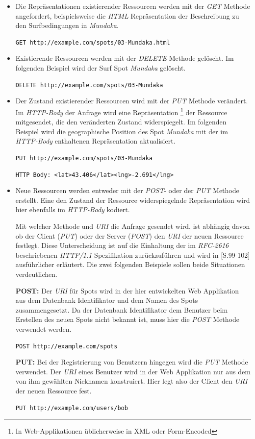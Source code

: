 \begin{itemize}
\item Die Repräsentationen existierender Ressourcen werden mit der
  \textit{GET} Methode angefordert, beispielsweise die \textit{HTML}
  Repräsentation der Beschreibung zu den Surfbedingungen in
  \textit{Mundaka}.

  \texttt{GET http://example.com/spots/03-Mundaka.html}

\item Existierende Ressourcen werden mit der \textit{DELETE} Methode
  gelöscht. Im folgenden Beispiel wird der Surf Spot \textit{Mundaka}
  gelöscht.

  \texttt{DELETE http://example.com/spots/03-Mundaka}

\item Der Zustand existierender Ressourcen wird mit der \textit{PUT}
  Methode verändert. Im \textit{HTTP-Body} der Anfrage wird eine
  Repräsentation \footnote{In Web-Applikationen üblicherweise in XML
    oder Form-Encoded} der Ressource mitgesendet, die den veränderten
  Zustand widerspiegelt. Im folgenden Beispiel wird die geographische
  Position des Spot \textit{Mundaka} mit der im \textit{HTTP-Body}
  enthaltenen Repräsentation aktualisiert.

  \texttt{PUT http://example.com/spots/03-Mundaka}

  \texttt{HTTP Body: <lat>43.406</lat><lng>-2.691</lng>}


\item Neue Ressourcen werden entweder mit der \textit{POST}- oder der
  \textit{PUT} Methode erstellt. Eine den Zustand der Ressource
  widerspiegelnde Repräsentation wird hier ebenfalls im
  \textit{HTTP-Body} kodiert.

  Mit welcher Methode und \textit{URI} die Anfrage gesendet wird, ist
  abhängig davon ob der Client (\textit{PUT}) oder der Server
  (\textit{POST}) den \textit{URI} der neuen Ressource festlegt. Diese
  Unterscheidung ist auf die Einhaltung der im \textit{RFC-2616}
   beschriebenen
  \textit{HTTP/1.1} Spezifikation zurückzuführen und wird in
  \cite{Richardson07}[S.99-102] ausführlicher erläutert. Die zwei
  folgenden Beispiele sollen beide Situationen verdeutlichen.

  \textbf{POST:} Der \textit{URI} für Spots wird in der hier
  entwickelten Web Applikation aus dem Datenbank Identifikator und dem
  Namen des Spots zusammengesetzt. Da der Datenbank Identifikator dem
  Benutzer beim Erstellen des neuen Spots nicht bekannt ist, muss hier
  die \textit{POST} Methode verwendet werden.

  \texttt{POST http://example.com/spots}

  \textbf{PUT:} Bei der Registrierung von Benutzern hingegen wird die
  \textit{PUT} Methode verwendet. Der \textit{URI} eines Benutzer wird
  in der Web Applikation nur aus dem von ihm gewählten Nicknamen
  konstruiert. Hier legt also der Client den \textit{URI} der neuen
  Ressource fest.

  \texttt{PUT http://example.com/users/bob}

\end{itemize}

